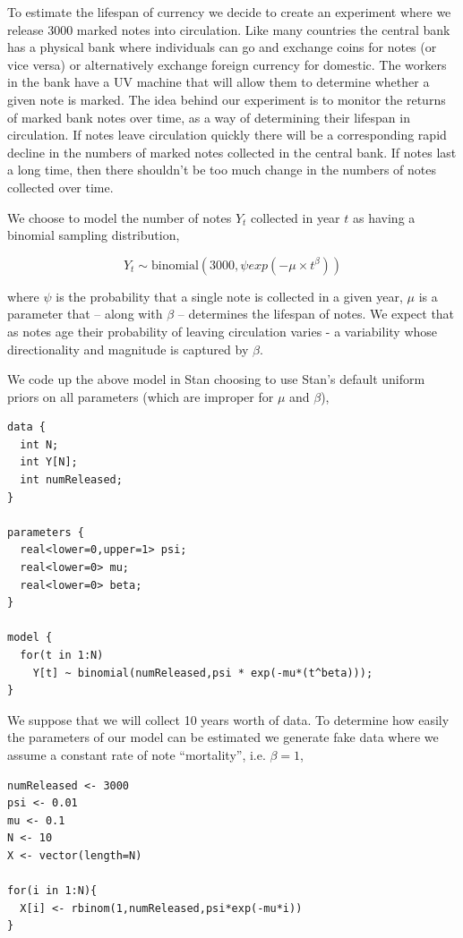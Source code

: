 \documentclass[11pt,fullpage]{book}
\begin{document}
To estimate the lifespan of currency we decide to create an experiment where we release 3000 marked notes into circulation. Like many countries the central bank has a physical bank where individuals can go and exchange coins for notes (or vice versa) or alternatively exchange foreign currency for domestic. The workers in the bank have a UV machine that will allow them to determine whether a given note is marked. The idea behind our experiment is to monitor the returns of marked bank notes over time, as a way of determining their lifespan in circulation. If notes leave circulation quickly there will be a corresponding rapid decline in the numbers of marked notes collected in the central bank. If notes last a long time, then there shouldn't be too much change in the numbers of notes collected over time.

We choose to model the number of notes $Y_t$ collected in year $t$ as having a binomial sampling distribution, 

\begin{equation}
Y_t \sim \text{binomial}(3000,\psi exp(-\mu \times t^\beta))
\end{equation}

where $\psi$ is the probability that a single note is collected in a given year, $\mu$ is a parameter that -- along with $\beta$ -- determines the lifespan of notes. We expect that as notes age their probability of leaving circulation varies - a variability whose directionality and magnitude is captured by $\beta$.

We code up the above model in Stan choosing to use Stan's default uniform priors on all parameters (which are improper for $\mu$ and $\beta$),

\begin{verbatim}
data { 
  int N; 
  int Y[N];
  int numReleased;
}

parameters { 
  real<lower=0,upper=1> psi;
  real<lower=0> mu;
  real<lower=0> beta;
}

model { 
  for(t in 1:N)
    Y[t] ~ binomial(numReleased,psi * exp(-mu*(t^beta)));
}
\end{verbatim}

We suppose that we will collect 10 years worth of data. To determine how easily the parameters of our model can be estimated we generate fake data where we assume a constant rate of note ``mortality'', i.e. $\beta=1$,

\begin{verbatim}
numReleased <- 3000
psi <- 0.01
mu <- 0.1
N <- 10
X <- vector(length=N)

for(i in 1:N){
  X[i] <- rbinom(1,numReleased,psi*exp(-mu*i))
}
\end{verbatim}
\end{document}
